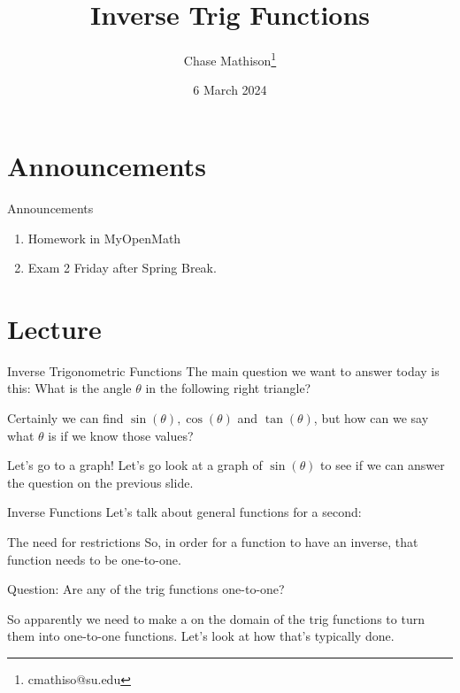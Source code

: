 \documentclass[presentation]{beamer}
\institute[SU]{Shenandoah University}
\author{Chase Mathison\thanks{cmathiso@su.edu}}
\date{6 March 2024}
\title{Inverse Trig Functions}
\begin{document}
\maketitle

\section{Announcements}
\label{sec:org71fa7e0}
\begin{frame}[label={sec:org4259e13}]{Announcements}
\begin{enumerate}
\item Homework in MyOpenMath
\item Exam 2 Friday after Spring Break.
\end{enumerate}
\end{frame}

\section{Lecture}
\label{sec:org94b6eb4}
\begin{frame}[label={sec:orgd09d315}]{Inverse Trigonometric Functions}
The main question we want to answer today is this:  What is the angle \(\theta\) in the following right triangle?


Certainly we can find \(\sin(\theta), \cos(\theta)\) and
\(\tan(\theta)\), but how can we say what \(\theta\) is if we know
those values?
\end{frame}

\begin{frame}[label={sec:org43e44c0}]{Let's go to a graph!}
Let's go look at a graph of \(\sin(\theta)\) to see if we can answer
the question on the previous slide.
\end{frame}

\begin{frame}[label={sec:orge2de97e}]{Inverse Functions}
Let's talk about general functions for a second:
\vspace{10in}
\end{frame}

\begin{frame}[label={sec:org9185451}]{The need for restrictions}
So, in order for a function to have an inverse, that function needs to be one-to-one.

Question: Are any of the trig functions one-to-one?

So apparently we need to make a \uline{\hspace*{1in}} on the domain of the
trig functions to turn them into one-to-one functions.  Let's look at
how that's \alert{typically} done.
\end{frame}
\end{document}
